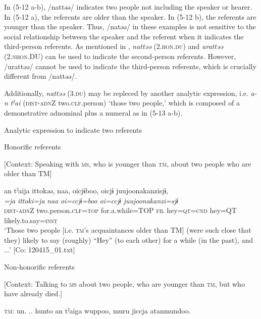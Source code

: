 In (5-12 a-b), /nattəə/ indicates two people not including the speaker or hearer. In (5-12 a), the referents are older than the speaker. In (5-12 b), the referents are younger than the speaker. Thus, /natəə/ in these examples is not sensitive to the social relationship between the speaker and the referent when it indicates the third-person referents. As mentioned in , \textit{nattəə} (2.\textsc{hon}.\textsc{du}) and \textit{urattəə} (2.\textsc{nhon}.DU) can be used to indicate the second-person referents. However, /urattəə/ cannot be used to indicate the third-person referents, which is crucially different from /nattəə/.

Additionally, \textit{nattəə} (3.\textsc{du}) may be repleced by another analytic expression, i.e. \textit{a-n} \textit{tˀai} (\textsc{dist}-\textsc{adn}Z two.\textsc{clf}.person) ‘those two people,’ which is composed of a demonstrative adnominal plus a numeral as in (5-13 a-b).

\ea \label{ex:5:13}   Analytic expression to indicate two referents

  \ea Honorific referents

  [Context: Speaking with \textsc{ms}, who is younger than \textsc{tm}, about two people who are older than TM]

\glll  an  tˀaija  ittokəə,  naa,  {\textbar}oi{\textbar}cjɨboo, {\textbar}oi{\textbar}cjɨ  {\textbar}juujoonakanzi{\textbar}sjɨ,\\
\textit{}  \textit{=ja}  \textit{ittoki=ja}  \textit{naa}  \textit{oi=ccjɨ=boo}  \textit{oi=ccjɨ}  \textit{juujoonakanzi=sjɨ}\\
\textsc{dist}-\textsc{adn}Z  two.person.\textsc{clf}=\textsc{top}  for.a.while=TOP  \textsc{fil}  hey=\textsc{qt}=\textsc{cnd}  hey=QT  likely.to.say=\textsc{inst}\\
\glt ‘Those two people [i.e. \textsc{tm}’s acquaintances older than TM] (were such close that they) likely to say (roughly) “Hey” (to each other) for a while (in the past), and ...’ [Co: 120415\_01.txt]

  \ex Non-honorific referents

  [Context: Talking to \textsc{ms} about two people, who are younger than \textsc{tm}, but who have already died.]

  \textsc{tm}:  un.  .. hunto  an  tˀaiga  wuppoo,  muru jiccja  atanmundoo.
                                                                                                  
